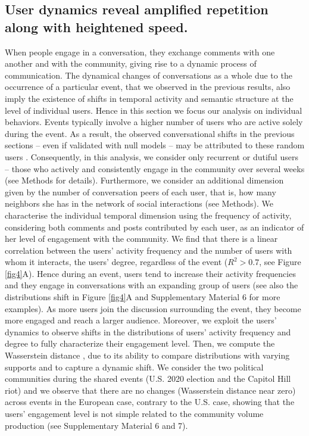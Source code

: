 \documentclass[fleqn,10pt]{wlscirep}
\begin{document}
%
\subsection*{User dynamics reveal amplified repetition along with heightened speed.}

When people engage in a conversation, they exchange comments with one another and with the community, giving rise to a dynamic process of communication.
The dynamical changes of conversations as a whole due to the occurrence of a particular event, that we observed in the previous results, also imply the existence of shifts in temporal activity and semantic structure at the level of individual users. 
Hence in this section we focus our analysis on individual behaviors. 
Events typically involve a higher number of users who are active solely during the event. 
As a result, the observed conversational shifts in the previous sections -- even if validated with null models -- may be attributed to these random users \cite{szell_contraction_2014}.
Consequently, in this analysis, we consider only recurrent or dutiful users -- those who actively and consistently engage in the community over several weeks (see Methods for details).
Furthermore, we consider an additional dimension given by the number of conversation peers of each user, that is, how many neighbors she has in the network of social interactions (see Methods).
We characterise the individual temporal dimension using the frequency of activity, considering both comments and posts contributed by each user, as an indicator of her level of engagement with the community.
We find that there is a linear correlation between the users' activity frequency and the number of users with whom it interacts, the users' degree, regardless of the event ($R^2 > 0.7$, see Figure \ref{fig4}A).
Hence during an event, users tend to increase their activity frequencies and they engage in conversations with an expanding group of users (see also the distributions shift in Figure \ref{fig4}A and Supplementary Material 6 for more examples). 
As more users join the discussion surrounding the event, they become more engaged and reach a larger audience.
Moreover, we exploit the users' dynamics to observe shifts in the distributions of users' activity frequency and degree to fully characterize their engagement level.
Then, we compute the Wasserstein distance \cite{kantorovich1960mathematical}, due to its ability to compare distributions with varying supports and to capture a dynamic shift. 
We consider the two political communities during the shared events (U.S. 2020 election and the Capitol Hill riot) and we observe that there are no changes (Wasserstein distance near zero) across events in the European case, contrary to the U.S. case, showing that the users' engagement level is not simple related to the community volume production (see Supplementary Material 6 and 7).
\end{document}

